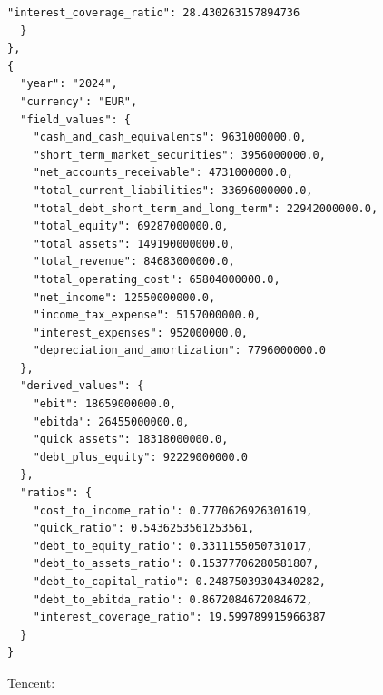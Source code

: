 \documentclass[12pt,a4paper]{article}
\begin{document}
\begin{lstlisting}[style=json, caption={Calculated financial ratios for LVMH (FY\,2022--2024)}, label=lst:ratios_lvmh]
    "interest_coverage_ratio": 28.430263157894736
  }
},
{
  "year": "2024",
  "currency": "EUR",
  "field_values": {
    "cash_and_cash_equivalents": 9631000000.0,
    "short_term_market_securities": 3956000000.0,
    "net_accounts_receivable": 4731000000.0,
    "total_current_liabilities": 33696000000.0,
    "total_debt_short_term_and_long_term": 22942000000.0,
    "total_equity": 69287000000.0,
    "total_assets": 149190000000.0,
    "total_revenue": 84683000000.0,
    "total_operating_cost": 65804000000.0,
    "net_income": 12550000000.0,
    "income_tax_expense": 5157000000.0,
    "interest_expenses": 952000000.0,
    "depreciation_and_amortization": 7796000000.0
  },
  "derived_values": {
    "ebit": 18659000000.0,
    "ebitda": 26455000000.0,
    "quick_assets": 18318000000.0,
    "debt_plus_equity": 92229000000.0
  },
  "ratios": {
    "cost_to_income_ratio": 0.7770626926301619,
    "quick_ratio": 0.5436253561253561,
    "debt_to_equity_ratio": 0.3311155050731017,
    "debt_to_assets_ratio": 0.15377706280581807,
    "debt_to_capital_ratio": 0.24875039304340282,
    "debt_to_ebitda_ratio": 0.8672084672084672,
    "interest_coverage_ratio": 19.599789915966387
  }
}
\end{lstlisting}

Tencent:
\end{document}
